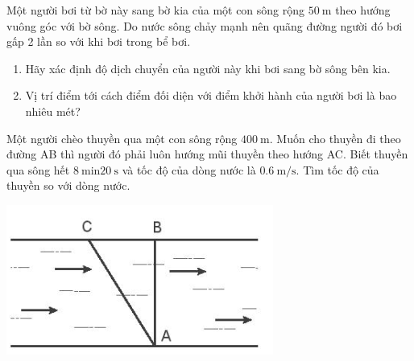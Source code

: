 \begin{ex}
	Một người bơi từ bờ này sang bờ kia của một con sông rộng $\SI{50}{\meter}$ theo hướng vuông góc với bờ sông. Do nước sông chảy mạnh nên quãng đường người đó bơi gấp 2 lần so với khi bơi trong bể bơi.
	\begin{enumerate}[label=\alph*)]
		\item Hãy xác định độ dịch chuyển của người này khi bơi sang bờ sông bên kia.
		\item Vị trí điểm tới cách điểm đối diện với điểm khởi hành của người bơi là bao nhiêu mét?
	\end{enumerate}
\end{ex}
\begin{ex}
	Một người chèo thuyền qua một con sông rộng $\SI{400}{\meter}$. Muốn cho thuyền đi theo đường AB thì người đó phải luôn hướng mũi thuyền theo hướng AC. Biết thuyền qua sông hết $\SI{8}{\minute} \SI{20}{\second}$ và tốc độ của dòng nước là $\SI{0.6}{\meter/\second}$. Tìm tốc độ của thuyền so với dòng nước.
	\begin{center}
		\includegraphics[scale=0.7]{figs/G10Y25B4-5}
	\end{center}
\end{ex}



